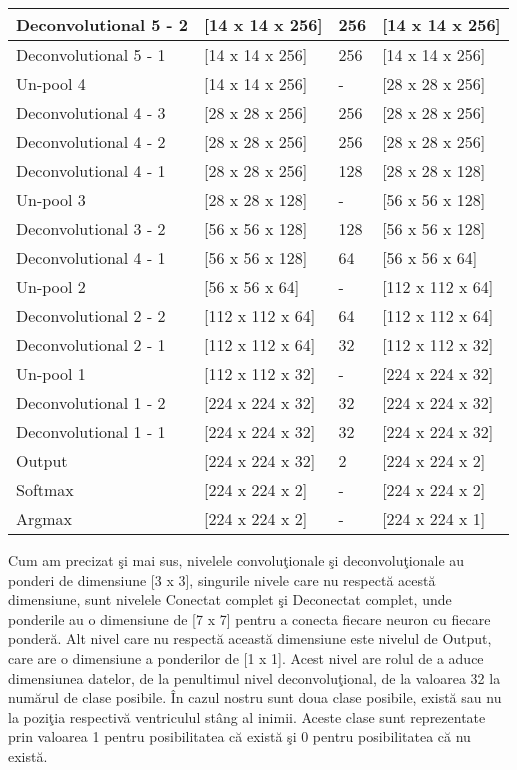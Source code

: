 \begin{center}
\begin{longtable}{|p{4cm}|p{3cm}|p{3cm}|p{3cm}|}
 \hline
 Deconvolutional 5 - 2 & [14 x 14 x 256] & 256 & [14 x 14 x 256] \\
 \hline
 Deconvolutional 5 - 1 & [14 x 14 x 256] & 256 & [14 x 14 x 256] \\
 \hline
 Un-pool 4  & [14 x 14 x 256] & - & [28 x 28 x 256] \\
 \hline
 Deconvolutional 4 - 3 & [28 x 28 x 256] & 256 & [28 x 28 x 256] \\
 \hline
 Deconvolutional 4 - 2 & [28 x 28 x 256] & 256 & [28 x 28 x 256] \\
 \hline
 Deconvolutional 4 - 1 & [28 x 28 x 256] & 128 & [28 x 28 x 128] \\
 \hline
 Un-pool 3  & [28 x 28 x 128] & - & [56 x 56 x 128] \\
 \hline
 Deconvolutional 3 - 2 & [56 x 56 x 128] & 128 & [56 x 56 x 128] \\
 \hline
 Deconvolutional 4 - 1 & [56 x 56 x 128] & 64 & [56 x 56 x 64] \\
 \hline
 Un-pool 2  & [56 x 56 x 64] & - & [112 x 112 x 64] \\
 \hline
 Deconvolutional 2 - 2 & [112 x 112 x 64] & 64 & [112 x 112 x 64] \\
 \hline
 Deconvolutional 2 - 1 & [112 x 112 x 64] & 32 & [112 x 112 x 32] \\
 \hline
  Un-pool 1  & [112 x 112 x 32] & - & [224 x 224 x 32] \\
 \hline
 Deconvolutional 1 - 2 & [224 x 224 x 32] & 32 & [224 x 224 x 32] \\
 \hline
 Deconvolutional 1 - 1 & [224 x 224 x 32] & 32 & [224 x 224 x 32] \\
 \hline
 Output & [224 x 224 x 32] & 2 & [224 x 224 x 2] \\
 \hline
 Softmax & [224 x 224 x 2] & - & [224 x 224 x 2] \\
 \hline
 Argmax & [224 x 224 x 2] & - & [224 x 224 x 1] \\
 \hline
\end{longtable}
\end{center}

Cum am precizat \c{s}i mai sus, nivelele convolu\c{t}ionale \c{s}i deconvolu\c{t}ionale au ponderi de dimensiune [3 x 3], singurile nivele care nu respect\u{a} acest\u{a} dimensiune, sunt nivelele Conectat complet \c{s}i Deconectat complet, unde ponderile au o dimensiune de [7 x 7] pentru a conecta fiecare neuron cu fiecare ponder\u{a}. Alt nivel care nu respect\u{a} aceast\u{a} dimensiune este nivelul de Output, care are o dimensiune a ponderilor de [1 x 1]. Acest nivel are rolul de a aduce dimensiunea datelor, de la penultimul nivel deconvolu\c{t}ional, de la valoarea 32 la num\u{a}rul de clase posibile. \^{I}n cazul nostru sunt doua clase posibile, exist\u{a} sau nu la pozi\c{t}ia respectiv\u{a} ventriculul st\^{a}ng al inimii. Aceste clase sunt reprezentate prin valoarea 1 pentru posibilitatea c\u{a} exist\u{a} \c{s}i 0 pentru posibilitatea c\u{a} nu exist\u{a}.

